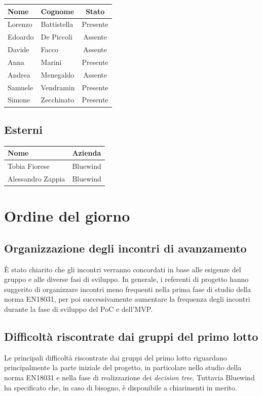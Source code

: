 \documentclass[a4paper, 10pt, colorlinks=true, linkcolor=black, urlcolor=blue, citecolor=blue, hidelinks]{article}
\begin{document}
\begin{center}
\begin{tabular}{|l|l|c|}
\hline
\textbf{Nome} & \textbf{Cognome} & \textbf{Stato} \\
\hline
Lorenzo & Battistella & Presente \\
Edoardo & De Piccoli & Assente \\
Davide & Facco & Assente \\
Anna & Marini & Presente \\
Andrea & Menegaldo & Assente \\
Samuele & Vendramin & Presente \\
Simone & Zecchinato & Presente \\
\hline
\end{tabular}
\end{center}

\subsection{Esterni}

\begin{center}
\begin{tabular}{|l|l|}
\hline
\textbf{Nome} & \textbf{Azienda} \\
\hline
Tobia Fiorese & Bluewind \\
\hline
Alessandro Zappia & Bluewind \\
\hline
\end{tabular}
\end{center}

\section{Ordine del giorno}

\subsection{Organizzazione degli incontri di avanzamento}
È stato chiarito che gli incontri verranno concordati in base alle esigenze del gruppo e alle diverse fasi di sviluppo. In generale, i referenti di progetto hanno suggerito di organizzare incontri meno frequenti nella prima fase di studio della norma EN18031, per poi successivamente aumentare la frequenza degli incontri durante la fase di sviluppo del PoC e dell'MVP.

\subsection{Difficoltà riscontrate dai gruppi del primo lotto}
Le principali difficoltà riscontrate dai gruppi del primo lotto riguardano principalmente la parte iniziale del progetto, in particolare nello studio della norma EN18031 e nella fase di realizzazione dei \textit{decision tree}. Tuttavia Bluewind ha specificato che, in caso di bisogno, è disponibile a chiarimenti in merito.
\end{document}
